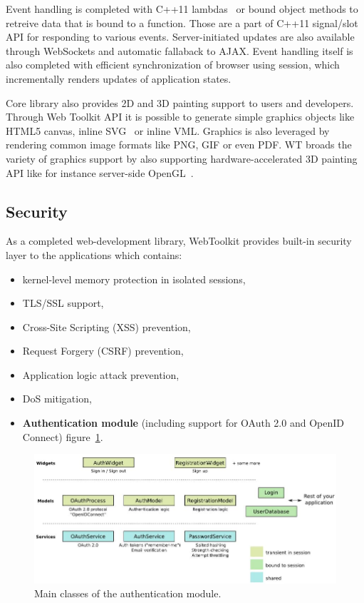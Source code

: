 \documentclass[a4paper,12pt]{book}
\newcommand\tab[1][1cm]{\hspace*{#1}}
\begin{document}
{{{\bigskip
Event handling is completed with C++11 lambdas~\cite{lambda} or bound object methods to retreive data that is bound to a function. Those are a part of C++11 signal/slot API for responding to various events. Server-initiated updates are also available through WebSockets and automatic fallaback to AJAX. Event handling itself is also completed with efficient synchronization of browser using session, which incrementally renders updates of application states.

\bigskip
Core library also provides 2D and 3D painting support to users and developers. Through Web Toolkit API it is possible to generate simple graphics objects like HTML5 canvas, inline SVG~\cite{svg} or inline VML. Graphics is also leveraged by rendering common image formats like PNG, GIF or even PDF. WT broads the variety of graphics support by also supporting hardware-accelerated 3D painting API like for instance server-side OpenGL~\cite{opengl}.
}

\subsection*{Security}
{
\tab As a completed web-development library, WebToolkit provides built-in security layer to the applications which contains:

\begin{itemize}
	\item kernel-level memory protection in isolated sessions,
	\item TLS/SSL support,
	\item Cross-Site Scripting (XSS) prevention,
	\item Request Forgery (CSRF) prevention,
	\item Application logic attack prevention,
	\item DoS mitigation,
	\item \textbf{Authentication module} (including support for OAuth 2.0 and OpenID Connect) figure~\ref{fig:authmod}.
\end{itemize}

\begin{figure}[h]
  \centering
    \includegraphics[width=1.1\textwidth]{auth-module}
    \caption{Main classes of the authentication module\cite{authmodule}.}
    \label{fig:authmod}
\end{figure}

}}}
\end{document}
